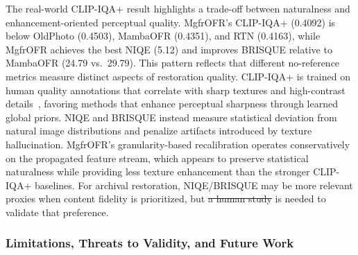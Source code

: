 \documentclass[symmetry,article,submit,pdftex,moreauthors]{Definitions/mdpi}
\providecommand{\DIFadd}[1]{{\protect\color{blue}\uwave{#1}}} %
\providecommand{\DIFdel}[1]{{\protect\color{red}\sout{#1}}}                      %
\providecommand{\DIFaddbegin}{} %
\providecommand{\DIFaddend}{} %
\providecommand{\DIFdelbegin}{} %
\providecommand{\DIFdelend}{} %
\begin{document}
The real-world CLIP-IQA+ result highlights a trade-off between naturalness and enhancement-oriented perceptual quality. MgfrOFR's CLIP-IQA+ (0.4092) is below OldPhoto (0.4503), MambaOFR (0.4351), and RTN (0.4163), while MgfrOFR achieves the best NIQE (5.12) and improves BRISQUE relative to MambaOFR (24.79 vs.\ 29.79). This pattern reflects \DIFaddbegin \DIFadd{the fact }\DIFaddend that different no-reference metrics measure distinct aspects of restoration quality. CLIP-IQA+ is trained on human quality annotations that correlate with sharp textures and high-contrast details~\cite{wang2023clipiqa}, favoring methods that enhance perceptual sharpness through learned global priors. NIQE and BRISQUE instead measure statistical deviation from natural image distributions and penalize artifacts introduced by texture hallucination. MgfrOFR's granularity-based recalibration operates conservatively on the propagated feature stream, which appears to preserve statistical naturalness while providing less texture enhancement than the stronger CLIP-IQA+ baselines. For archival restoration, NIQE/BRISQUE may be more relevant proxies when content fidelity is prioritized, but \DIFdelbegin \DIFdel{a human study }\DIFdelend \DIFaddbegin \DIFadd{human evaluation }\DIFaddend is needed to validate that preference.

\subsubsection{Limitations, Threats to Validity, and Future Work}
\label{subsec:limitations}
\end{document}
